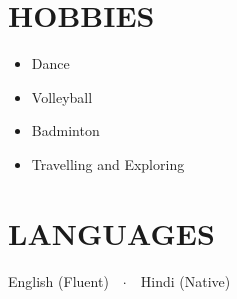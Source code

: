 \documentclass[letterpaper,11pt]{article}
\begin{document}
\section{HOBBIES}

\begin{itemize}[leftmargin=0.25in, itemsep=2pt, parsep=0pt, topsep=0pt]
  \item Dance
  \item Volleyball
  \item Badminton
  \item Travelling and Exploring
\end{itemize}

\section{LANGUAGES}

English (Fluent)~~$\cdot$~~Hindi (Native)
\end{document}
